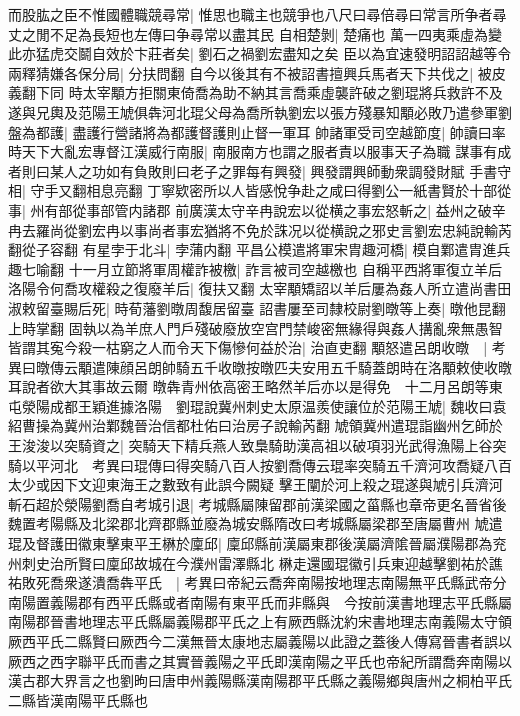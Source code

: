 而股肱之臣不惟國體職競尋常|{
	惟思也職主也競爭也八尺曰尋倍尋曰常言所争者尋丈之閒不足為長短也左傳曰争尋常以盡其民}
自相楚剝|{
	楚痛也}
萬一四夷乘虛為變此亦猛虎交鬬自效於卞莊者矣|{
	劉石之禍劉宏盡知之矣}
臣以為宜速發明詔詔越等令兩釋猜嫌各保分局|{
	分扶問翻}
自今以後其有不被詔書擅興兵馬者天下共伐之|{
	被皮義翻下同}
時太宰顒方拒關東倚喬為助不納其言喬乘虛襲許破之劉琨將兵救許不及遂與兄輿及范陽王虓俱犇河北琨父母為喬所執劉宏以張方殘暴知顒必敗乃遣參軍劉盤為都護|{
	盡護行營諸將為都護督護則止督一軍耳}
帥諸軍受司空越節度|{
	帥讀曰率}
時天下大亂宏專督江漢威行南服|{
	南服南方也謂之服者責以服事天子為職}
謀事有成者則曰某人之功如有負敗則曰老子之罪每有興發|{
	興發謂興師動衆調發財賦}
手書守相|{
	守手又翻相息亮翻}
丁寧欵密所以人皆感悅争赴之咸曰得劉公一紙書賢於十部從事|{
	州有部從事部管内諸郡}
前廣漢太守辛冉說宏以從横之事宏怒斬之|{
	益州之破辛冉去羅尚從劉宏冉以事尚者事宏猶將不免於誅况以從横說之邪史言劉宏忠純說輸芮翻從子容翻}
有星孛于北斗|{
	孛蒲内翻}
平昌公模遣將軍宋胄趣河橋|{
	模自鄴遣胄進兵趣七喻翻}
十一月立節將軍周權詐被檄|{
	詐言被司空越檄也}
自稱平西將軍復立羊后洛陽令何喬攻權殺之復廢羊后|{
	復扶又翻}
太宰顒矯詔以羊后屢為姦人所立遣尚書田淑敕留臺賜后死|{
	時荀藩劉暾周馥居留臺}
詔書屢至司隸校尉劉暾等上奏|{
	暾他昆翻上時掌翻}
固執以為羊庶人門戶殘破廢放空宫門禁峻密無緣得與姦人搆亂衆無愚智皆謂其寃今殺一枯窮之人而令天下傷慘何益於治|{
	治直吏翻}
顒怒遣呂朗收暾　|{
	考異曰暾傳云顒遣陳顔呂朗帥騎五千收暾按暾匹夫安用五千騎蓋朗時在洛顒敕使收暾耳說者欲大其事故云爾}
暾犇青州依高密王略然羊后亦以是得免　十二月呂朗等東屯滎陽成都王穎進據洛陽　劉琨說冀州刺史太原温羨使讓位於范陽王虓|{
	魏收曰袁紹曹操為冀州治鄴魏晉治信都杜佑曰治房子說輸芮翻}
虓領冀州遣琨詣幽州乞師於王浚浚以突騎資之|{
	突騎天下精兵燕人致梟騎助漢高祖以破項羽光武得漁陽上谷突騎以平河北　考異曰琨傳曰得突騎八百人按劉喬傳云琨率突騎五千濟河攻喬疑八百太少或因下文迎東海王之數致有此誤今闕疑}
擊王闡於河上殺之琨遂與虓引兵濟河斬石超於滎陽劉喬自考城引退|{
	考城縣屬陳留郡前漢梁國之菑縣也章帝更名晉省後魏置考陽縣及北梁郡北齊郡縣並廢為城安縣隋改曰考城縣屬梁郡至唐屬曹州}
虓遣琨及督護田徽東擊東平王楙於廩邱|{
	廩邱縣前漢屬東郡後漢屬濟隂晉屬濮陽郡為兖州刺史治所賢曰廩邱故城在今濮州雷澤縣北}
楙走還國琨徽引兵東迎越擊劉祐於譙祐敗死喬衆遂潰喬犇平氏　|{
	考異曰帝紀云喬奔南陽按地理志南陽無平氏縣武帝分南陽置義陽郡有西平氏縣或者南陽有東平氏而非縣與　今按前漢書地理志平氏縣屬南陽郡晉書地理志平氏縣屬義陽郡平氏之上有厥西縣沈約宋書地理志南義陽太守領厥西平氏二縣賢曰厥西今二漢無晉太康地志屬義陽以此證之蓋後人傳寫晉書者誤以厥西之西字聯平氏而書之其實晉義陽之平氏即漢南陽之平氏也帝紀所謂喬奔南陽以漢古郡大界言之也劉昫曰唐申州義陽縣漢南陽郡平氏縣之義陽鄉與唐州之桐柏平氏二縣皆漢南陽平氏縣也}
